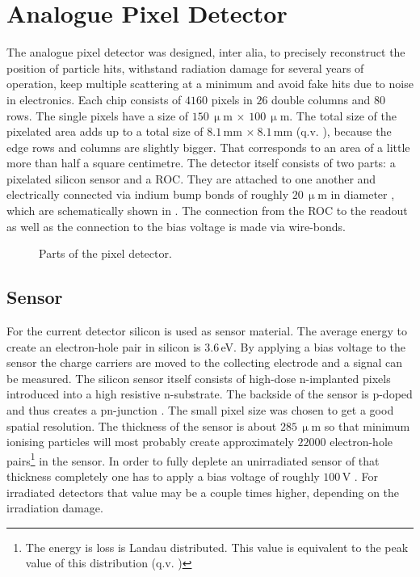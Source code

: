 \documentclass[british,11pt,a4paper]{memoir}
\begin{document}
\section{Analogue Pixel Detector}\label{s130}
The analogue pixel detector was designed, inter alia, to precisely reconstruct the position of particle hits, withstand radiation damage for several years of operation, keep multiple scattering at a minimum and avoid fake hits due to noise in electronics. Each chip consists of $4160$ pixels in $26$ double columns and $80$ rows. The single pixels have a size of $150\,\upmu$m $\times$ $100\,\upmu$m. The total size of the pixelated area adds up to a total size of $8.1\,$mm $\times\ 8.1\,$mm (q.v. ), because the edge rows and columns are slightly bigger. That corresponds to an area of a little more than half a square centimetre. The detector itself consists of two parts: a pixelated silicon sensor and a \ac{ROC}. They are attached to one another and electrically connected via indium bump bonds of roughly $20\,\upmu$m in diameter \cite{kaestli}, which are schematically shown in . The connection from the \ac{ROC} to the readout as well as the connection to the bias voltage is made via wire-bonds.
\begin{figure}[ht]
	\centering
	\hfill
	\caption{Parts of the pixel detector.}
	\label{panaroc}
\end{figure}\no
\subsection{Sensor}\label{s220}
For the current detector silicon is used as sensor material. The average energy to create an electron-hole pair in silicon is $3.6\,$eV. By applying a bias voltage to the sensor the charge carriers are moved to the collecting electrode and a signal can be measured. The silicon sensor itself consists of high-dose n-implanted pixels introduced into a high resistive n-substrate. The backside of the sensor is p-doped and thus creates a pn-junction \cite{allkofer}. The small pixel size was chosen to get a good spatial resolution. The thickness of the sensor is about $285\,\upmu$m so that minimum ionising particles will most probably create approximately $22000$ electron-hole pairs\footnote{The energy is loss is Landau distributed. This value is equivalent to the peak value of this distribution (q.v. )} in the sensor. In order to fully deplete an unirradiated sensor of that thickness completely one has to apply a bias voltage of roughly $100\,$V \cite{pixadd}. For irradiated detectors that value may be a couple times higher, depending on the irradiation damage. 
\end{document}
